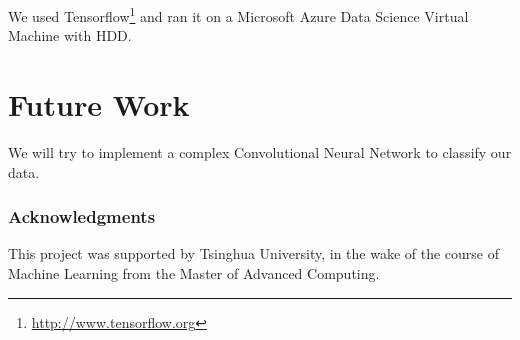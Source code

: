 \documentclass{article} %
\begin{document}
		We used Tensorflow\footnote{\url{http://www.tensorflow.org}} and ran it on a Microsoft Azure Data Science Virtual Machine with HDD.

\section{Future Work}
	We will try to implement a complex Convolutional Neural Network to classify our data.

\subsubsection*{Acknowledgments}

	This project was supported by Tsinghua University, in the wake of the course of Machine Learning from the Master of Advanced Computing.

\nocite{*}


\end{document}
